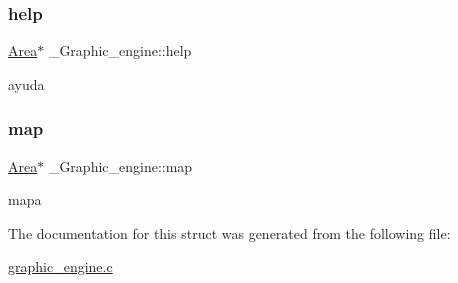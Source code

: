\subsubsection{\texorpdfstring{help}{help}}
{\footnotesize\ttfamily \hyperlink{screen_8h_acfdfc42f6522d75fa3c16713afde8127}{Area}$\ast$ \+\_\+\+Graphic\+\_\+engine\+::help}

ayuda \mbox{\label{struct__Graphic__engine_a1ea06bb881d335da8c31d63b3e834bdb}} 
\subsubsection{\texorpdfstring{map}{map}}
{\footnotesize\ttfamily \hyperlink{screen_8h_acfdfc42f6522d75fa3c16713afde8127}{Area}$\ast$ \+\_\+\+Graphic\+\_\+engine\+::map}

mapa 

The documentation for this struct was generated from the following file\+:\begin{DoxyCompactItemize}
\item 
\hyperlink{graphic__engine_8c}{graphic\+\_\+engine.\+c}\end{DoxyCompactItemize}
